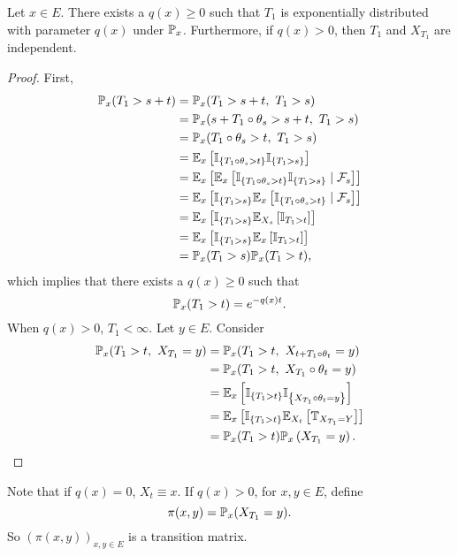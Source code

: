 \begin{lem}
    Let $x \in E$. There exists a $q(x) \geq 0$ such that $T_1$ is exponentially distributed with parameter $q(x)$ under $\mathbb{P}_x$. Furthermore, if $q(x)>0$, then $T_1$ and $X_{T_1}$ are independent.
\end{lem}
\begin{proof}
    First,
    \begin{align*}
        \mathbb{P}_x(T_1 > s+t) &= \mathbb{P}_x(T_1 > s+t,~T_1>s) \\
        &= \mathbb{P}_x(s + T_1 \circ \theta_s > s+t,~T_1 > s)\\
        &= \mathbb{P}_x(T_1 \circ \theta_s > t,~T_1 > s)\\
        &= \mathbb{E}_x\left[\mathbb{I}_{\left\{T_1 \circ \theta_s > t\right\}}\mathbb{I}_{\left\{T_1 > s\right\}}\right] \\
        &= \mathbb{E}_x\left[\mathbb{E}_x\left[\mathbb{I}_{\left\{T_1 \circ \theta_s > t\right\}}\mathbb{I}_{\left\{T_1 > s\right\}} \mid \mathcal{F}_s\right]\right] \\
        &= \mathbb{E}_x\left[\mathbb{I}_{\left\{T_1 > s\right\}}\mathbb{E}_x\left[\mathbb{I}_{\left\{T_1 \circ \theta_s > t\right\}} \mid \mathcal{F}_s\right]\right] \\
        &= \mathbb{E}_x\left[\mathbb{I}_{\left\{T_1 > s\right\}}\mathbb{E}_{X_s}\left[\mathbb{I}_{T_1 > t}\right]\right] \\
        &= \mathbb{E}_x\left[\mathbb{I}_{\left\{T_1 > s\right\}}\mathbb{E}_x\left[\mathbb{I}_{T_1 > t}\right]\right] \\
        &= \mathbb{P}_x(T_1 > s)\mathbb{P}_x(T_1 >t),
    \end{align*}
    which implies that there exists a $q(x) \geq 0$ such that
    \begin{equation*}
        \mathbb{P}_x(T_1 >t) = e^{-q(x)t}.
    \end{equation*}
    When $q(x) > 0$, $T_1 < \infty$. Let $y \in E$. Consider
    \begin{align*}
        \mathbb{P}_x(T_1 > t,~X_{T_1} = y) &= \mathbb{P}_x(T_1 > t,~X_{t+T_1\circ \theta_t} = y) \\
        &=\mathbb{P}_x(T_1 > t,~X_{T_1} \circ \theta_t = y) \\
        &= \mathbb{E}_x\left[\mathbb{I}_{\left\{T_1 > t\right\}} \mathbb{I}_{\left\{X_{T_1} \circ \theta_t = y\right\}}\right] \\
        &= \mathbb{E}_x\left[\mathbb{I}_{\left\{T_1 > t\right\}}\mathbb{E}_{X_t}\left[\mathbb{T}_{X_{T_1} = Y}\right]\right] \\
        &= \mathbb{P}_x(T_1 > t)\mathbb{P}_x\left(X_{T_1} = y\right). \qedhere
    \end{align*} 
\end{proof}

\noindent Note that if $q(x) = 0$, $X_t \equiv x$. If $q(x) > 0$, for $x,y \in E$, define
\begin{equation*}
    \pi(x,y) = \mathbb{P}_x(X_{T_1} = y).
\end{equation*}
So $(\pi(x,y))_{x,y \in E}$ is a transition matrix. 


